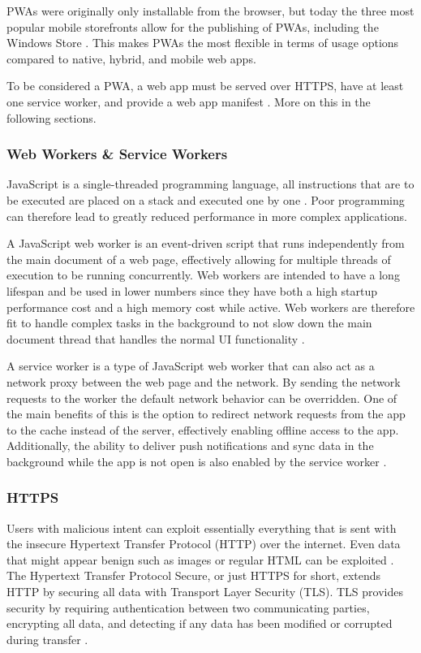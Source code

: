 \documentclass[a4paper,12pt]{article}
\begin{document}
PWAs were originally only installable from the browser, but today the three most popular mobile storefronts allow for the publishing of PWAs, including the Windows Store \cite{how_to_publish_pwa_in_stores} . This makes PWAs the most flexible in terms of usage options compared to native, hybrid, and mobile web apps.

To be considered a PWA, a web app must be served over HTTPS, have at least one service worker, and provide a web app manifest \cite{serviceworker_efficiency}. More on this in the following sections.

\subsubsection{Web Workers \& Service Workers}
\label{Theory_PWA_serviceWorkers}
JavaScript is a single-threaded programming language, all instructions that are to be executed are placed on a stack and executed one by one \cite{mozilla_js}. Poor programming can therefore lead to greatly reduced performance in more complex applications.

A JavaScript web worker is an event-driven script that runs independently from the main document of a web page, effectively allowing for multiple threads of execution to be running concurrently. Web workers are intended to have a long lifespan and be used in lower numbers since they have both a high startup performance cost and a high memory cost while active. Web workers are therefore fit to handle complex tasks in the background to not slow down the main document thread that handles the normal UI functionality \cite{workers_html_spec}.

A service worker is a type of JavaScript web worker that can also act as a network proxy between the web page and the network. By sending the network requests to the worker the default network behavior can be overridden. One of the main benefits of this is the option to redirect network requests from the app to the cache instead of the server, effectively enabling offline access to the app. Additionally, the ability to deliver push notifications and sync data in the background while the app is not open is also enabled by the service worker \cite{service_workers_spec}.

\subsubsection{HTTPS}
\label{Theory_PWA_HTTPS}
Users with malicious intent can exploit essentially everything that is sent with the insecure Hypertext Transfer Protocol (HTTP) over the internet. Even data that might appear benign such as images or regular HTML can be exploited \cite{why_https_matters}. The Hypertext Transfer Protocol Secure, or just HTTPS for short, extends HTTP by securing all data with Transport Layer Security (TLS). TLS provides security by requiring authentication between two communicating parties, encrypting all data, and detecting if any data has been modified or corrupted during transfer \cite{secure_with_https}.
\end{document}
